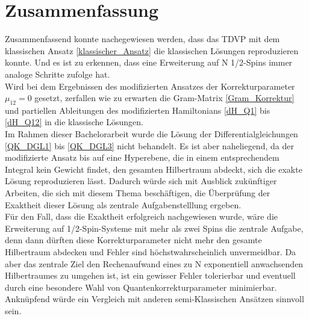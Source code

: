 \chapter{Zusammenfassung}
Zusammenfassend konnte nachegewiesen werden, dass das TDVP mit dem klassischen Ansatz \ref{klassischer_Ansatz} die klassischen Lösungen reproduzieren 
konnte. Und es ist zu erkennen, dass eine Erweiterung auf N 1/2-Spins immer analoge Schritte zufolge hat.\\
Wird bei dem Ergebnissen des modifizierten Ansatzes der Korrekturparameter $\mu_{12}=0$ gesetzt, zerfallen wie zu erwarten
die Gram-Matrix \ref{Gram_Korrektur} und partiellen Ableitungen des modifizierten Hamiltonians \ref{dH_Q1} bis \ref{dH_Q12} in die klassische Lösungen.\\

Im Rahmen dieser Bachelorarbeit wurde die Lösung der Differentialgleichungen \ref{QK_DGL1} bis \ref{QK_DGL3} nicht behandelt. Es ist aber naheliegend, 
da der modifizierte Ansatz bis auf eine Hyperebene, die in einem entsprechendem Integral kein Gewicht findet, den gesamten Hilbertraum abdeckt, sich 
die exakte Lösung reproduzieren lässt. Dadurch würde sich mit Ausblick zukünftiger Arbeiten, die sich mit diesem Thema beschäftigen, die Überprüfung 
der Exaktheit dieser Lösung als zentrale Aufgabenstelllung ergeben. \\
Für den Fall, dass die Exaktheit erfolgreich nachgewiesen wurde, wäre die Erweiterung auf 1/2-Spin-Systeme mit mehr als zwei Spins die zentrale Aufgabe, 
denn dann dürften diese Korrekturparameter nicht mehr den gesamte Hilbertraum abdecken und Fehler sind höchstwahrscheinlich unvermeidbar. 
Da aber das zentrale Ziel den Rechenaufwand eines zu N exponentiell anwachsenden Hilbertraumes zu umgehen ist, ist 
ein gewisser Fehler tolerierbar und eventuell durch eine besondere Wahl von Quantenkorrekturparameter minimierbar. Anknüpfend würde ein Vergleich mit 
anderen semi-Klassischen Ansätzen sinnvoll sein.
